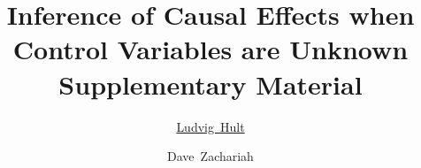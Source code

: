 \documentclass[accepted]{uai2021} %
\title{Inference of Causal Effects when Control Variables are Unknown Supplementary Material}
\author[1]{\href{mailto:Ludvig~Hult<ludvig.hult@gmail.com>?Subject=Your UAI 2021 paper}{Ludvig~Hult}{}} %
\author[1]{Dave~Zachariah}
\affil[1]{%
    Systems and Control\\
    Uppsala Universitet\\
    Uppsala, Sweden
}
\theoremstyle{plain}
\theoremstyle{remark}
\begin{document}
\onecolumn
\maketitle

\clearpage

\end{document}
